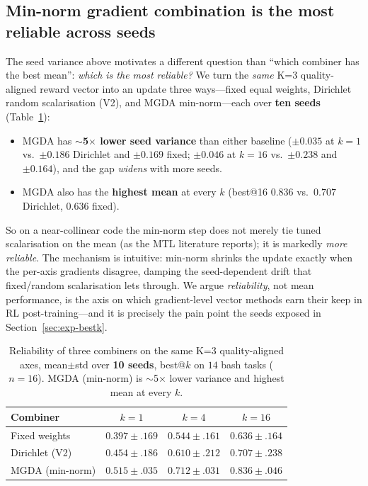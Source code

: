 \documentclass[11pt,a4paper]{article}
\begin{document}
\subsection{Min-norm gradient combination is the most reliable across seeds}
\label{sec:exp-reliability}

The seed variance above motivates a different question than ``which combiner has
the best mean'': \emph{which is the most reliable?}  We turn the \emph{same} K=3
quality-aligned reward vector into an update three ways---fixed equal weights,
Dirichlet random scalarisation (V2), and MGDA min-norm---each over \textbf{ten
seeds} (Table~\ref{tab:reliability}):
\begin{itemize}[nosep]
\item MGDA has \textbf{$\sim$5$\times$ lower seed variance} than either baseline
  ($\pm0.035$ at $k{=}1$ vs.\ $\pm0.186$ Dirichlet and $\pm0.169$ fixed; $\pm0.046$
  at $k{=}16$ vs.\ $\pm0.238$ and $\pm0.164$), and the gap \emph{widens} with more
  seeds.
\item MGDA also has the \textbf{highest mean} at every $k$ (best@16 $0.836$ vs.\
  $0.707$ Dirichlet, $0.636$ fixed).
\end{itemize}
So on a near-collinear code the min-norm step does not merely tie tuned
scalarisation on the mean (as the MTL literature reports); it is markedly
\emph{more reliable}.  The mechanism is intuitive: min-norm shrinks the update
exactly when the per-axis gradients disagree, damping the seed-dependent drift
that fixed/random scalarisation lets through.  We argue \emph{reliability}, not
mean performance, is the axis on which gradient-level vector methods earn their
keep in RL post-training---and it is precisely the pain point the seeds exposed
in Section~\ref{sec:exp-bestk}.

\begin{table}[h]\centering
\caption{Reliability of three combiners on the same K=3 quality-aligned axes,
mean$\pm$std over \textbf{10 seeds}, best@$k$ on $14$ bash tasks ($n{=}16$).
MGDA (min-norm) is $\sim$5$\times$ lower variance and highest mean at every $k$.}
\label{tab:reliability}
\begin{tabular}{@{}lccc@{}}\toprule
Combiner & $k{=}1$ & $k{=}4$ & $k{=}16$ \\ \midrule
Fixed weights   & $0.397{\pm}.169$ & $0.544{\pm}.161$ & $0.636{\pm}.164$ \\
Dirichlet (V2)  & $0.454{\pm}.186$ & $0.610{\pm}.212$ & $0.707{\pm}.238$ \\
MGDA (min-norm) & $\mathbf{0.515{\pm}.035}$ & $\mathbf{0.712{\pm}.031}$ & $\mathbf{0.836{\pm}.046}$ \\
\bottomrule\end{tabular}
\end{table}
\end{document}

